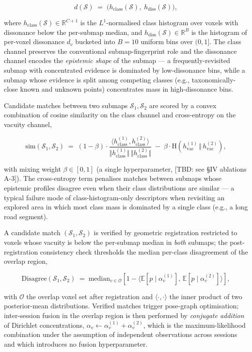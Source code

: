 \documentclass[
]{article}
\begin{document}
\[
d(\mathcal{S}) \;=\; \big( h_{\text{class}}(\mathcal{S}), \; h_{\text{diss}}(\mathcal{S}) \big), \tag{7}
\]

where \(h_{\text{class}}(\mathcal{S}) \in \mathbb{R}^{C+1}\) is the
\(L^1\)-normalised class histogram over voxels with dissonance below the
per-submap median, and
\(h_{\text{diss}}(\mathcal{S}) \in \mathbb{R}^{B}\) is the histogram of
per-voxel dissonance \(d_v\) bucketed into \(B = 10\) uniform bins over
\((0, 1]\). The class channel preserves the conventional
submap-fingerprint role and the dissonance channel encodes the
\emph{epistemic shape} of the submap --- a frequently-revisited submap
with concentrated evidence is dominated by low-dissonance bins, while a
submap whose evidence is split among competing classes (e.g.,
taxonomically-close known and unknown points) concentrates mass in
high-dissonance bins.

Candidate matches between two submaps \(\mathcal{S}_1, \mathcal{S}_2\)
are scored by a convex combination of cosine similarity on the class
channel and cross-entropy on the vacuity channel,

\[
\mathrm{sim}(\mathcal{S}_1, \mathcal{S}_2)
\;=\;
(1-\beta) \cdot \frac{\langle h_{\text{class}}^{(1)}, h_{\text{class}}^{(2)} \rangle}{\Vert h_{\text{class}}^{(1)} \Vert \, \Vert h_{\text{class}}^{(2)} \Vert}
\;-\;
\beta \cdot \mathrm{H}\!\left( h_{\text{vac}}^{(1)} \,\Vert\, h_{\text{vac}}^{(2)} \right) , \tag{8}
\]

with mixing weight \(\beta \in [0, 1]\) (a single hyperparameter,
{[}TBD: see §IV ablations A-3{]}). The cross-entropy term penalises
matches between submaps whose epistemic profiles disagree even when
their class distributions are similar --- a typical failure mode of
class-histogram-only descriptors when revisiting an explored area in
which most class mass is dominated by a single class (e.g., a long road
segment).

A candidate match \((\mathcal{S}_1, \mathcal{S}_2)\) is verified by
geometric registration restricted to voxels whose vacuity is below the
per-submap median in \emph{both} submaps; the post-registration
consistency check thresholds the median per-class disagreement of the
overlap region,

\[
\mathrm{Disagree}(\mathcal{S}_1, \mathcal{S}_2)
\;=\;
\mathrm{median}_{v \in \mathcal{O}}
\left[ 1 - \big\langle \mathbb{E}[p \mid \alpha_v^{(1)}],\, \mathbb{E}[p \mid \alpha_v^{(2)}] \big\rangle \right] , \tag{9}
\]

with \(\mathcal{O}\) the overlap voxel set after registration and
\(\langle \cdot, \cdot \rangle\) the inner product of two posterior-mean
distributions. Verified matches trigger pose-graph optimisation;
inter-session fusion in the overlap region is then performed by
\emph{conjugate addition} of Dirichlet concentrations,
\(\alpha_v \gets \alpha_v^{(1)} + \alpha_v^{(2)}\), which is the
maximum-likelihood combination under the assumption of independent
observations across sessions and which introduces no fusion
hyperparameter.
\end{document}
